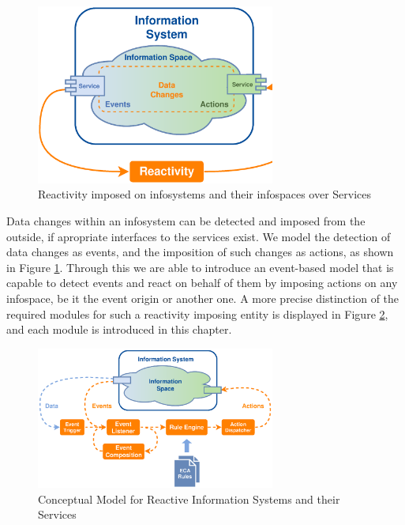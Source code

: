 \begin{figure}[!ht]
  \centering
  \includegraphics[width=0.7\textwidth]{figures/IS_InformationSpace}
  \caption{Reactivity imposed on \textrm{\glspl{infosystem}} and their \textrm{\glspl{infospace}} over Services}
  \label{fig:IS_InformationSpace}
\end{figure}
Data changes within an \textrm{\gls{infosystem}} can be detected and imposed from the outside, if apropriate interfaces to the services exist.
We model the detection of data changes as events, and the imposition of such changes as actions, as shown in Figure \ref{fig:IS_InformationSpace}.
Through this we are able to introduce an event-based model that is capable to detect events and react on behalf of them by imposing actions on any \textrm{\gls{infospace}}, be it the event origin or another one.
A more precise distinction of the required modules for such a reactivity imposing entity is displayed in Figure \ref{fig:Standard-Model-Template}, and each module is introduced in this chapter.
\begin{figure}[!ht]
  \centering
  \includegraphics[width=0.7\textwidth]{figures/Standard-Model-Template}
  \caption{Conceptual Model for Reactive Information Systems and their Services}
  \label{fig:Standard-Model-Template}
\end{figure}



